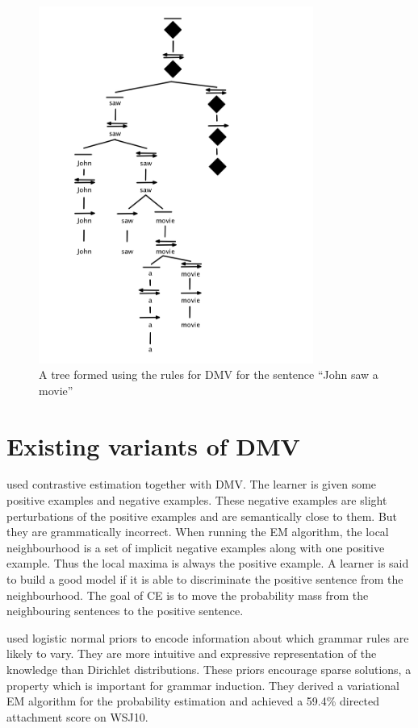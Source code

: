 \documentclass{book}
\begin{document}
\begin{figure}[!ht]
\centering
\includegraphics[width=90mm]{images/DMV_grammar.jpg}
\caption{A tree formed using the rules for DMV for the sentence ``John saw a movie''}
\label{overflow}
\end{figure}

\section{Existing variants of DMV}

\citep{smith2005} used contrastive estimation together with DMV. The learner is given some positive examples and negative examples. These negative examples are slight perturbations of the positive examples and are semantically close to them. But they are grammatically incorrect. When running the EM algorithm, the local neighbourhood is a set of implicit negative examples along with one positive example. Thus the local maxima is always the positive example. A learner is said to build a good model if it is able to discriminate the positive sentence from the neighbourhood. The goal of CE is to move the probability mass from the neighbouring sentences to the positive sentence.

\citep{cohen2008} used logistic normal priors to encode information about which grammar rules are likely to vary. They are more intuitive and expressive representation of the knowledge than Dirichlet distributions. These priors encourage sparse solutions, a property which is important for grammar induction. They derived a variational EM algorithm for the probability estimation and achieved a 59.4\% directed attachment score on WSJ10. 
\end{document}
